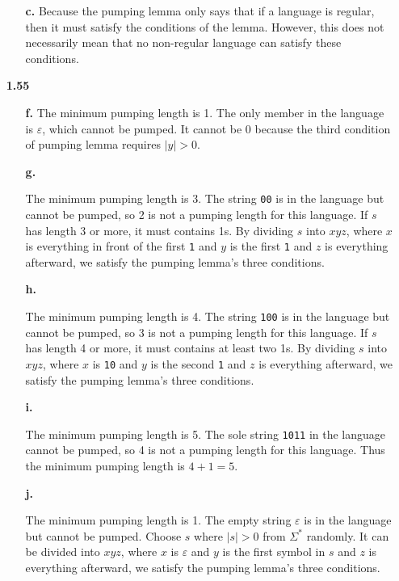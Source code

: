 \begin{enumerate}
\begin{enumerate}
        \item[{\bf c.}] Because the pumping lemma only says that if a language is regular, then it must satisfy the conditions of the lemma. However, this does not necessarily mean that no non-regular language can satisfy these conditions.
    \end{enumerate}
    
    \item[{\bf 1.55}]
    \begin{enumerate}
        \item[{\bf f.}] The minimum pumping length is 1. The only member in the language is $\varepsilon$, which cannot be pumped. It cannot be 0 because the third condition of pumping lemma requires $|y|>0$.
        \item[{\bf g.}]
        
        The minimum pumping length is 3. The string {\tt 00} is in the language but cannot be pumped, so 2 is not a pumping length for this language. If $s$ has length 3 or more, it must contains 1s. By dividing $s$ into $xyz$, where $x$ is everything in front of the first {\tt 1} and $y$ is the first {\tt 1} and $z$ is everything afterward, we satisfy the pumping lemma’s three conditions.
        
        \item[{\bf h.}]
        
        The minimum pumping length is 4. The string {\tt 100} is in the language but cannot be pumped, so 3 is not a pumping length for this language. If $s$ has length 4 or more, it must contains at least two 1s. By dividing $s$ into $xyz$, where $x$ is {\tt 10} and $y$ is the second {\tt 1} and $z$ is everything afterward, we satisfy the pumping lemma’s three conditions.
        
        \item[{\bf i.}]
        
        The minimum pumping length is 5. The sole string {\tt 1011} in the language cannot be pumped, so 4 is not a pumping length for this language. Thus the minimum pumping length is $4+1=5$.
        
        \item[{\bf j.}]
        
        The minimum pumping length is 1. The empty string $\varepsilon$ is in the language but cannot be pumped. Choose $s$ where $|s|>0$ from $\Sigma^\ast$ randomly. It can be divided into $xyz$, where $x$ is $\varepsilon$ and $y$ is the first symbol in $s$ and $z$ is everything afterward, we satisfy the pumping lemma's three conditions.
    \end{enumerate}
    

\end{enumerate}
